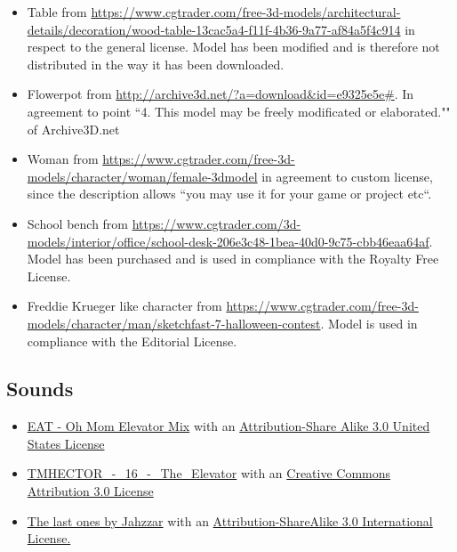 \documentclass[12pt]{article}
\begin{document}
\begin{itemize}
\item Table from \url{https://www.cgtrader.com/free-3d-models/architectural-details/decoration/wood-table-13cac5a4-f11f-4b36-9a77-af84a5f4c914} in respect to the general license. Model has been modified and is therefore not distributed in the way it has been downloaded.

\item Flowerpot from \url{http://archive3d.net/?a=download\&id=e9325e5e#}. In agreement to point ``4. This model may be freely modificated or elaborated."" of Archive3D.net

\item Woman from \url{https://www.cgtrader.com/free-3d-models/character/woman/female-3dmodel} in agreement to custom license, since the description allows ``you may use it for your game or project etc``.

\item School bench from
\url{ https://www.cgtrader.com/3d-models/interior/office/school-desk-206e3c48-1bea-40d0-9c75-cbb46eaa64af}. Model has been purchased and is used in compliance with the Royalty Free License.

\item Freddie Krueger like character from
\url{https://www.cgtrader.com/free-3d-models/character/man/sketchfast-7-halloween-contest}. Model is used in compliance with the Editorial License.

\end{itemize}

\subsection{Sounds}

\begin{itemize}
\item \href{http://freemusicarchive.org/music/EAT/20100129104001364/Oh_Mom_Elevator_Mix}{EAT - Oh Mom Elevator Mix} with an \href{http://creativecommons.org/licenses/by-sa/3.0/us/}{Attribution-Share Alike 3.0 United States License}
\item \href{http://freemusicarchive.org/music/TMHECTOR/The_Haunted_Mansion/DS10Forumcom\_-\_DS10Forumcom\_-\_The_Haunted_Mansion\_-\_16\_The\_Elevator}{TMHECTOR\_-\_16\_-\_The\_Elevator} with an \href{http://creativecommons.org/licenses/by/3.0/}{Creative Commons Attribution 3.0 License}

\item \href{http://freemusicarchive.org/music/Jahzzar/Smoke_Factory/The_last_ones}{The last ones by Jahzzar} with an \href{http://creativecommons.org/licenses/by-sa/3.0/}{Attribution-ShareAlike 3.0 International License.}

\end{itemize}
\end{document}
